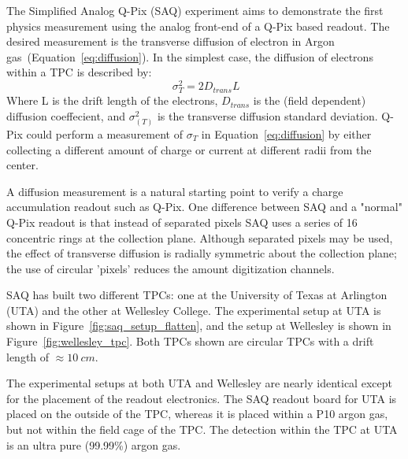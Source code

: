 The Simplified Analog Q-Pix (SAQ) experiment aims to demonstrate the first physics measurement using the analog front-end of a Q-Pix based readout.
The desired measurement is the transverse diffusion of electron in Argon gas~(Equation~\ref{eq:diffusion}).
In the simplest case, the diffusion of electrons within a TPC is described by:
\begin{equation}~\label{eq:diffusion}
 \sigma^{2}_{T} = 2D_{trans}L
\end{equation}
Where L is the drift length of the electrons, $D_{trans}$ is the (field dependent) diffusion coeffecient, and $\sigma^{2}_(T)$ is the transverse diffusion standard deviation.
Q-Pix could perform a measurement of $\sigma_{T}$ in Equation~\ref{eq:diffusion} by either collecting a different amount of charge or current at different radii from the center.

A diffusion measurement is a natural starting point to verify a charge accumulation readout such as Q-Pix.
One difference between SAQ and a "normal" Q-Pix readout is that instead of separated pixels SAQ uses a series of 16 concentric rings at the collection plane.
Although separated pixels may be used, the effect of transverse diffusion is radially symmetric about the collection plane; the use of circular 'pixels' reduces the amount digitization channels.

SAQ has built two different TPCs: one at the University of Texas at Arlington (UTA) and the other at Wellesley College.
The experimental setup at UTA is shown in Figure~\ref{fig:saq_setup_flatten}, and the setup at Wellesley is shown in Figure~\ref{fig:wellesley_tpc}.
Both TPCs shown are circular TPCs with a drift length of $\approx 10~\unit{cm}$.

The experimental setups at both UTA and Wellesley are nearly identical except for the placement of the readout electronics.
The SAQ readout board for UTA is placed on the outside of the TPC, whereas it is placed within a P10 argon gas, but not within the field cage of the TPC.
The detection within the TPC at UTA is an ultra pure (99.99\%) argon gas.

